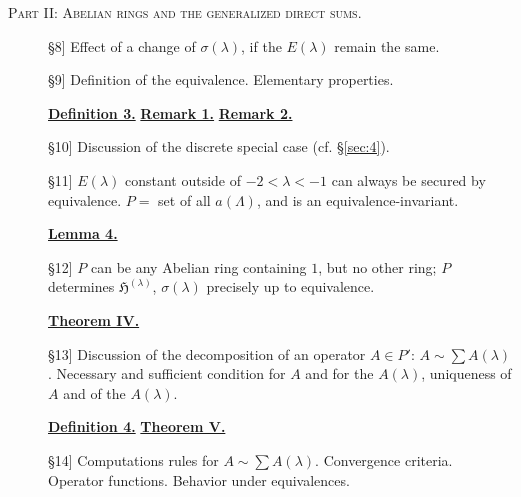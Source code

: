 \documentclass[b5paper,12pt,twoside]{article}
\numberwithin{equation}{section}
\theoremstyle{vnplain}
\theoremstyle{vndefinition}
\newcommand{\secref}[1]{\hyperref[#1]{\S\ref*{#1}}}
\newcommand{\tocsec}[1]{\hyperref[sec:#1]{\S#1}}
\begin{document}
\noindent\textsc{Part II: Abelian rings and the generalized direct sums.}
\begin{description}
\item[\tocsec{8}] Effect of a change of $\sigma(\lambda)$, if the
$E(\lambda)$ remain the same.
\item[\tocsec{9}] Definition of the equivalence. Elementary
properties.
\begin{center}\hyperref[def:3]{\textbf{Definition 3.}}\quad
\hyperref[rem:9.1]{\textbf{Remark 1.}}\quad
\hyperref[rem:9.2]{\textbf{Remark 2.}}\end{center}
\item[\tocsec{10}] Discussion of the discrete special case
(cf. \secref{sec:4}).
\item[\tocsec{11}] $E(\lambda)$ constant outside of
$-2<\lambda<-1$ can always be secured by equivalence. $P=$ set of all
$a(\Lambda)$, and is an equivalence-invariant.
\begin{center}\hyperref[lem:4]{\textbf{Lemma 4.}}\end{center}
\item[\tocsec{12}] $P$ can be any Abelian ring containing $1$, but
no other ring; $P$ determines $\mathfrak H^{(\lambda)}$, $\sigma(\lambda)$
precisely up to equivalence.
\begin{center}\hyperref[thm:IV]{\textbf{Theorem IV.}}\end{center}
\item[\tocsec{13}] Discussion of the decomposition of an operator
$A\in P'$: $A\sim\sum A(\lambda)$. Necessary and sufficient condition for $A$
and for the $A(\lambda)$, uniqueness of $A$ and of the $A(\lambda)$.
\begin{center}\hyperref[def:4]{\textbf{Definition 4.}}\quad
\hyperref[thm:V]{\textbf{Theorem V.}}\end{center}
\item[\tocsec{14}] Computations rules for
$A\sim\sum A(\lambda)$. Convergence criteria. Operator functions. Behavior
under equivalences.
\end{description}
\end{document}
